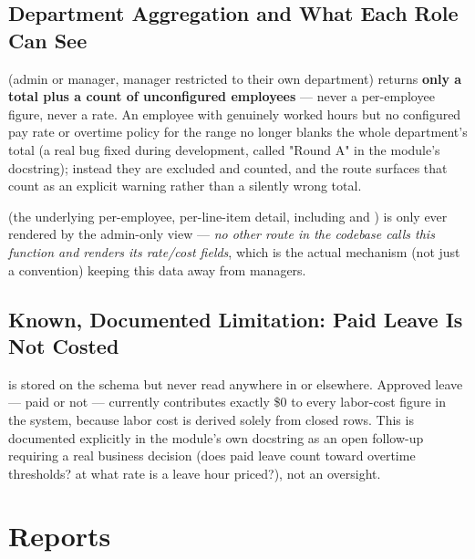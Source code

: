 \subsection*{Department Aggregation and What Each Role Can See}

 (admin or manager, manager
restricted to their own department) returns \textbf{only a total plus a
count of unconfigured employees} --- never a per-employee figure, never
a rate. An employee with genuinely worked hours but no configured pay
rate or overtime policy for the range no longer blanks the whole
department's total (a real bug fixed during development, called "Round
A" in the module's docstring); instead they are excluded and counted,
and the route surfaces that count as an explicit warning rather than a
silently wrong total.

 (the underlying
per-employee, per-line-item detail, including  and
) is only ever rendered by the admin-only
 view --- \emph{no other route in the
codebase calls this function and renders its rate/cost fields}, which
is the actual mechanism (not just a convention) keeping this data away
from managers.

\subsection*{Known, Documented Limitation: Paid Leave Is Not Costed}

 is stored on the schema but never read
anywhere in  or elsewhere. Approved leave --- paid
or not --- currently contributes exactly \$0 to every labor-cost figure
in the system, because labor cost is derived solely from closed
 rows. This is documented explicitly in the
module's own docstring as an open follow-up requiring a real business
decision (does paid leave count toward overtime thresholds? at what
rate is a leave hour priced?), not an oversight.

\section{Reports}

